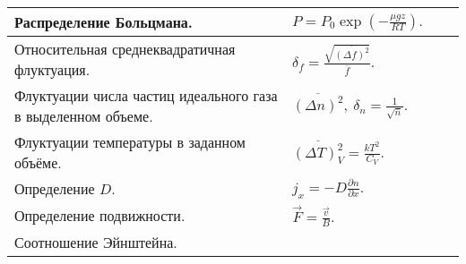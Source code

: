 \documentclass{article}
\begin{document}
\begin{tabular}{ |p{4.3cm}|p{5.2cm}|p{4.3cm}|p{5.2cm}|  }
                                                                             \\ %
\hline
Распределение Больцмана.                                                     &  %
$P = P_0 \exp \left( -\frac{\mu g z}{RT} \right).$                           &  %
                                                                             &  %
                                                                             \\ %
\hline
Относительная среднеквадратичная флуктуация.                                 &  %
$\delta_f = \frac{\sqrt{\overline{(\Delta f)^2}}}{\overline f}.$             &  %
                                                                             &  %
                                                                             \\ %
\hline
Флуктуации числа частиц идеального газа в выделенном объеме.                 &  %
$\overline{(\Delta n)^2}, \: \delta_n = \frac{1}{\sqrt{\overline{n}}}.$      &  %
                                                                             &  %
                                                                             \\ %
\hline
Флуктуации температуры в заданном объёме.                                    &  %
$\overline{(\Delta T)^2_V} = \frac{kT^2}{C_V}.$                              &  %
                                                                             &  %
                                                                             \\ %
\hline
Определение $D$.                                                             &  %
$j_x = -D \frac{\partial n}{\partial x}.$                                    &  %
                                                                             &  %
                                                                             \\ %
\hline
Определение подвижности.                                                     &  %
$\vec{F} = \frac{\vec{v}}{B}.$                                               &  %
                                                                             &  %
                                                                             \\ %
\hline
Соотношение Эйнштейна.                                                       &  %

\end{tabular}
\end{document}
